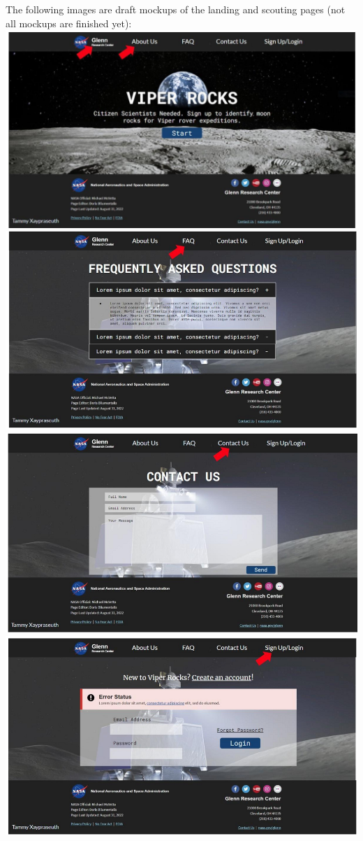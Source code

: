 \documentclass{article}
\begin{document}
The following images are draft mockups of the landing and scouting pages (not all mockups are finished yet): \\
\includegraphics{landing_page_1}
\includegraphics{landing_page_2}
\includegraphics{landing_page_3}
\includegraphics{landing_page_4}
\end{document}
